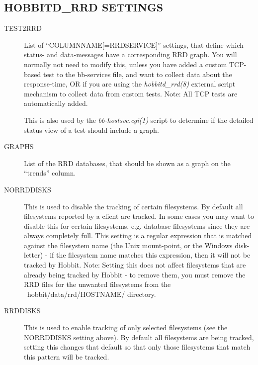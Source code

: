 \subsection{HOBBITD\_RRD SETTINGS}


 \begin{description}
\item[TEST2RRD] List of ``COLUMNNAME[=RRDSERVICE]'' settings, that define which status- and data-messages have a corresponding RRD graph. You will normally not need to modify this, unless you have added a custom TCP-based test to the bb-services file, and want to collect data about the response-time, OR if you are using the \emph{hobbitd\_rrd(8)}
 external script mechanism to collect data from custom tests. Note: All TCP tests are automatically added. 

  This is also used by the \emph{bb-hostsvc.cgi(1) }
 script to determine if the detailed status view of a test should include a graph. 


 

\item[GRAPHS] List of the RRD databases, that should be shown as a graph on the ``trends'' column. 

 

\item[NORRDDISKS] This is used to disable the tracking of certain filesystems. By default all filesystems reported by a client are tracked. In some cases you may want to disable this for certain filesystems, e.g. database filesystems since they are always completely full. This setting is a regular expression that is matched against the filesystem name (the Unix mount-point, or the Windows disk-letter) - if the filesystem name matches this expression, then it will not be tracked by Hobbit.  
 Note: Setting this does not affect filesystems that are already being tracked by Hobbit - to remove them, you must remove the RRD files for the unwanted filesystems from the ~hobbit/data/rrd/HOSTNAME/ directory. 

 

\item[RRDDISKS] This is used to enable tracking of only selected filesystems (see the NORRDDISKS setting above). By default all filesystems are being tracked, setting this changes that default so that only those filesystems that match this pattern will be tracked. 

 


 


\end{description}


